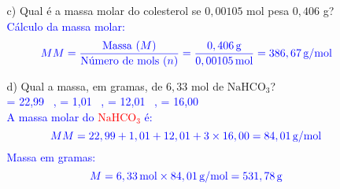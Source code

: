 \documentclass[a4paper, 12pt]{article}
\begin{document}
\begin{enumerate}
\begin{enumerate}[align=left, labelsep=-0.5em]
\[                    \]
              \item[c)] Qual é a massa molar do colesterol se \(0,00105\) mol pesa \(0,406\) g?
                    \\[10pt]
                    \textcolor{blue}{Cálculo da massa molar:}
                    \[
                        \textcolor{blue}{\text{\text{$MM$}} = \frac{\text{Massa (\text{$M$})}}{\text{Número de mols (\text{$n$})}} = \frac{0,406 \, \text{g}}{0,00105 \, \text{mol}} = 386,67 \, \text{g/mol}}
                    \]
              \item[d)] Qual a massa, em gramas, de \(6,33\) mol de \(\text{NaHCO}_{3}\)?
                    \\[10pt]
                    \textcolor{blue}{\textcolor{red}{} = 22,99 \, , \quad \textcolor{red}{} = 1,01 \, , \quad \textcolor{red}{} = 12,01 \, , \quad \textcolor{red}{} = 16,00 \, }
                    \\[10pt]
                    \textcolor{blue}{A massa molar do \textcolor{red}{\(\text{NaHCO}_{3}\)} é:}
                    \[
                        \textcolor{blue}{\text{$MM$} = 22,99 + 1,01 + 12,01 + 3 \times 16,00 = 84,01 \, \text{g/mol}}
                    \]
                    \textcolor{blue}{Massa em gramas:}
                    \[
                        \textcolor{blue}{\text{$M$} = 6,33 \, \text{mol} \times 84,01 \, \text{g/mol} = 531,78 \, \text{g}}
                    \]


\end{enumerate}
\end{enumerate}
\end{document}
